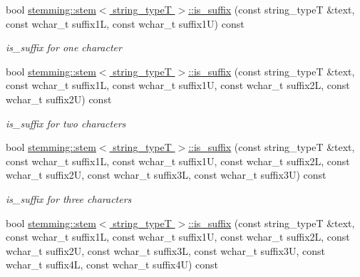 \begin{DoxyCompactItemize}
\item 
\hypertarget{group___stemming_gac318ddd46a716673edf3678c47d3035c}{bool \hyperlink{group___stemming_gac318ddd46a716673edf3678c47d3035c}{stemming\-::stem$<$ string\-\_\-type\-T $>$\-::is\-\_\-suffix} (const string\-\_\-type\-T \&text, const wchar\-\_\-t suffix1\-L, const wchar\-\_\-t suffix1\-U) const }\label{group___stemming_gac318ddd46a716673edf3678c47d3035c}

\begin{DoxyCompactList}\small\item\em is\-\_\-suffix for one character \end{DoxyCompactList}\item 
\hypertarget{group___stemming_gaad4dff424a3ae8a82dcfe6adac7c9d30}{bool \hyperlink{group___stemming_gaad4dff424a3ae8a82dcfe6adac7c9d30}{stemming\-::stem$<$ string\-\_\-type\-T $>$\-::is\-\_\-suffix} (const string\-\_\-type\-T \&text, const wchar\-\_\-t suffix1\-L, const wchar\-\_\-t suffix1\-U, const wchar\-\_\-t suffix2\-L, const wchar\-\_\-t suffix2\-U) const }\label{group___stemming_gaad4dff424a3ae8a82dcfe6adac7c9d30}

\begin{DoxyCompactList}\small\item\em is\-\_\-suffix for two characters \end{DoxyCompactList}\item 
\hypertarget{group___stemming_gabbe6496d43b49dab0745e6d6b4e2831d}{bool \hyperlink{group___stemming_gabbe6496d43b49dab0745e6d6b4e2831d}{stemming\-::stem$<$ string\-\_\-type\-T $>$\-::is\-\_\-suffix} (const string\-\_\-type\-T \&text, const wchar\-\_\-t suffix1\-L, const wchar\-\_\-t suffix1\-U, const wchar\-\_\-t suffix2\-L, const wchar\-\_\-t suffix2\-U, const wchar\-\_\-t suffix3\-L, const wchar\-\_\-t suffix3\-U) const }\label{group___stemming_gabbe6496d43b49dab0745e6d6b4e2831d}

\begin{DoxyCompactList}\small\item\em is\-\_\-suffix for three characters \end{DoxyCompactList}\item 
\hypertarget{group___stemming_ga694dd20e52adc89edadf120bf92a28ff}{bool \hyperlink{group___stemming_ga694dd20e52adc89edadf120bf92a28ff}{stemming\-::stem$<$ string\-\_\-type\-T $>$\-::is\-\_\-suffix} (const string\-\_\-type\-T \&text, const wchar\-\_\-t suffix1\-L, const wchar\-\_\-t suffix1\-U, const wchar\-\_\-t suffix2\-L, const wchar\-\_\-t suffix2\-U, const wchar\-\_\-t suffix3\-L, const wchar\-\_\-t suffix3\-U, const wchar\-\_\-t suffix4\-L, const wchar\-\_\-t suffix4\-U) const }\label{group___stemming_ga694dd20e52adc89edadf120bf92a28ff}


\end{DoxyCompactItemize}
